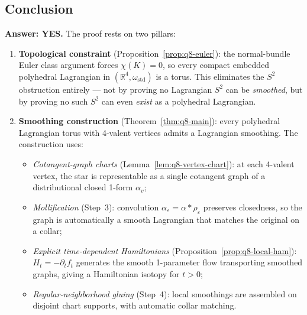 \subsection*{Conclusion}

\textbf{Answer: YES.}  The proof rests on two pillars:

\begin{enumerate}
\item \textbf{Topological constraint} (Proposition~\ref{prop:q8-euler}):
  the normal-bundle Euler class argument forces $\chi(K)=0$,
  so every compact embedded polyhedral Lagrangian in $(\mathbb R^4,\omega_{\mathrm{std}})$ is a torus.
  This eliminates the $S^2$ obstruction entirely --- not by proving no Lagrangian $S^2$ can be
  \emph{smoothed}, but by proving no such $S^2$ can even \emph{exist}
  as a polyhedral Lagrangian.

\item \textbf{Smoothing construction} (Theorem~\ref{thm:q8-main}):
  every polyhedral Lagrangian torus with 4-valent vertices admits a Lagrangian smoothing.
  The construction uses:
  \begin{itemize}
  \item \emph{Cotangent-graph charts} (Lemma~\ref{lem:q8-vertex-chart}):
    at each 4-valent vertex, the star is representable as a single cotangent graph
    of a distributional closed 1-form $\alpha_v$;
  \item \emph{Mollification} (Step~3):
    convolution $\alpha_\varepsilon=\alpha\ast\rho_\varepsilon$ preserves closedness,
    so the graph is automatically a smooth Lagrangian that matches the original on a collar;
  \item \emph{Explicit time-dependent Hamiltonians} (Proposition~\ref{prop:q8-local-ham}):
    $H_t=-\partial_t f_t$ generates the smooth 1-parameter flow
    transporting smoothed graphs, giving a Hamiltonian isotopy for $t>0$;
  \item \emph{Regular-neighborhood gluing} (Step~4):
    local smoothings are assembled on disjoint chart supports, with automatic collar matching.
  \end{itemize}
\end{enumerate}

